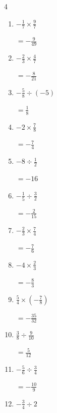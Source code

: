 \begin{multicols}{4}
\begin{enumerate}
        $\displaystyle =\frac{35}{9}$

  \item $\displaystyle -\frac{1}{7}\times{}\frac{9}{7}$

        $\displaystyle =-\frac{9}{49}$

  \item $\displaystyle -\frac{2}{3}\times{}\frac{4}{7}$

        $\displaystyle =-\frac{8}{21}$

  \item $\displaystyle -\frac{5}{8}\div{}\left(-5\right)$

        $\displaystyle =\frac{1}{8}$

  \item $\displaystyle -2\times{}\frac{7}{8}$

        $\displaystyle =-\frac{7}{4}$

  \item $\displaystyle -8\div{}\frac{1}{2}$

        $\displaystyle =-16$

  \item $\displaystyle -\frac{1}{5}\div{}\frac{3}{2}$

        $\displaystyle =-\frac{2}{15}$

  \item $\displaystyle -\frac{2}{3}\times{}\frac{7}{4}$

        $\displaystyle =-\frac{7}{6}$

  \item $\displaystyle -4\times{}\frac{2}{3}$

        $\displaystyle =-\frac{8}{3}$

  \item $\displaystyle \frac{5}{4}\times{}\left(-\frac{7}{8}\right)$

        $\displaystyle =-\frac{35}{32}$

\columnbreak %

  \item $\displaystyle \frac{3}{8}\div{}\frac{9}{10}$

        $\displaystyle =\frac{5}{12}$

  \item $\displaystyle -\frac{5}{6}\div{}\frac{3}{4}$

        $\displaystyle =-\frac{10}{9}$

  \item $\displaystyle -\frac{3}{4}\div{}2$


\end{enumerate}
\end{multicols}
